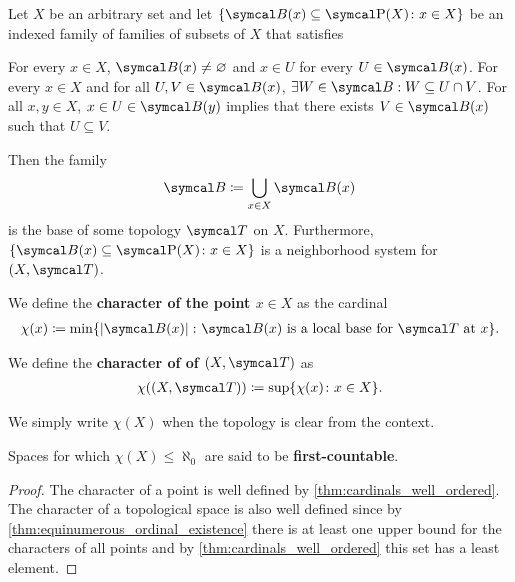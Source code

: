 \begin{proposition}\label{thm:topological_local_base_axioms}\cite[13]{Engelking1989}
  Let \( X \) be an arbitrary set and let \( \{ \Cal{B}(x) \subseteq \Power(X) \colon x \in X \} \) be an indexed family of families of subsets of \( X \) that satisfies
  \begin{description}
     For every \( x \in X \), \( \Cal{B}(x) \neq \varnothing \) and \( x \in U \) for every \( U \in \Cal{B}(x) \).
     For every \( x \in X \) and for all \( U, V \in \Cal{B}(x) \), \( \exists W \in \Cal{B}: W \subseteq U \cap V \).
     For all \( x, y \in X \), \( x \in U \in \Cal{B}(y) \) implies that there exists \( V \in \Cal{B}(x) \) such that \( U \subseteq V \).
  \end{description}

  Then the family
  \begin{align*}
    \Cal{B} \coloneqq \bigcup_{x \in X} \Cal{B}(x)
  \end{align*}
  is the base of some topology \( \Cal{T} \) on \( X \). Furthermore, \( \{ \Cal{B}(x) \subseteq \Power(X) \colon x \in X \} \) is a neighborhood system for \( (X, \Cal{T}) \).
\end{proposition}

\begin{definition}\label{def:topological_space_character}
  We define the \textbf{character of the point \( x \in X \)} as the cardinal
  \begin{align*}
    \chi(x) \coloneqq \min \{ \Abs{\Cal{B(x)}} \colon \Cal{B(x)} \text{ is a local base for } \Cal{T} \text{ at } x \}.
  \end{align*}

  We define the \textbf{character of of \( (X, \Cal{T}) \)} as
  \begin{align*}
    \chi((X, \Cal{T})) \coloneqq \sup \{ \chi(x) \colon x \in X \}.
  \end{align*}

  We simply write \( \chi(X) \) when the topology is clear from the context.

  Spaces for which \( \chi(X) \leq \aleph_0 \) are said to be \textbf{first-countable}.
\end{definition}
\begin{proof}
  The character of a point is well defined by \cref{thm:cardinals_well_ordered}. The character of a topological space is also well defined since by \cref{thm:equinumerous_ordinal_existence} there is at least one upper bound for the characters of all points and by \cref{thm:cardinals_well_ordered} this set has a least element.
\end{proof}

